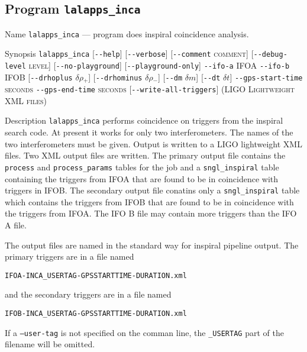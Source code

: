 \subsection{Program \texttt{lalapps\_inca}}
\label{program:lalapps-inca}

\begin{entry}
\item[Name]
\verb$lalapps_inca$ --- program does inspiral coincidence analysis.

\item[Synopsis]
\verb$lalapps_inca$ 
[\verb$--help$]
[\verb$--verbose$]
[\verb$--comment$ \textsc{comment}]
[\verb$--debug-level$ \textsc{level}] \newline
%
[\verb$--no-playground$]
[\verb$--playground-only$]
\verb$--ifo-a$ \textsc{IFOA} 
\verb$--ifo-b$ \textsc{IFOB} \newline
%
[\verb$--drhoplus$ \textsc{$\delta\rho_{+}$}]
[\verb$--drhominus$ \textsc{$\delta\rho_{-}$}]
[\verb$--dm$ \textsc{$\delta m$}]
[\verb$--dt$ \textsc{$\delta t$}] \newline
%
\verb$--gps-start-time$ \textsc{seconds} 
\verb$--gps-end-time$ \textsc{seconds} 
[\verb$--write-all-triggers$] \newline
%
\textsc{(LIGO Lightweight XML files)}

\item[Description] 
\verb$lalapps_inca$ performs coincidence on triggers from the inspiral
search code.  At present it works for only two interferometers. The names
of the two interferometers must be given. Output is written to a LIGO
lightweight XML files. Two XML output files are written.  The primary output
file contains the \texttt{process} and \texttt{process\_params} tables for the
job and a \texttt{sngl\_inspiral} table containing the triggers from
\textsc{IFOA} that are found to be in coincidence with triggers in
\textsc{IFOB}. The secondary output file conatins only a
\texttt{sngl\_inspiral} table which contains the triggers from \textsc{IFOB}
that are found to be in coincidence with the triggers from \textsc{IFOA}. The
IFO B file may contain more triggers than the IFO A file.

The output files are named in the standard way for inspiral pipeline output.
The primary triggers are in a file named\\
\begin{center}
\texttt{IFOA-INCA\_USERTAG-GPSSTARTTIME-DURATION.xml}\\
\end{center}
and the secondary triggers are in a file named\\
\begin{center}
\texttt{IFOB-INCA\_USERTAG-GPSSTARTTIME-DURATION.xml}\\
\end{center}
If a \texttt{--user-tag} is not specified on the comman line, the
\texttt{\_USERTAG} part of the filename will be omitted.


\end{entry}
